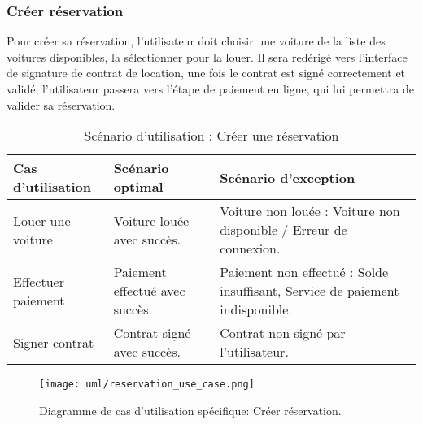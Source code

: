 \subsubsection{Créer réservation}
Pour créer sa réservation, l'utilisateur doit choisir une voiture de la liste des voitures disponibles, la sélectionner pour la louer. Il sera redérigé vers l'interface de signature de contrat de location, une fois le contrat est signé correctement et validé, l'utilisateur passera vers l'étape de paiement en ligne, qui lui permettra de valider sa réservation.
\begin{table}[H]
    \begin{center}
        \begin{tabularx}{\textwidth} {
                | >{\centering\arraybackslash}X
                | >{\centering\arraybackslash}X
                | >{\centering\arraybackslash}X |}
            \hline
            Cas d'utilisation  & Scénario optimal               & Scénario d'exception                                                         \\
            \hline
            Louer une voiture  & Voiture louée avec succès.     & Voiture non louée : Voiture non disponible / Erreur de connexion.            \\
            \hline
            Effectuer paiement & Paiement effectué avec succès. & Paiement non effectué : Solde insuffisant, Service de paiement indisponible. \\
            \hline
            Signer contrat     & Contrat signé avec succès.     & Contrat non signé par l'utilisateur.                                         \\
            \hline
        \end{tabularx}
        \captionsetup{justification=centering}
        \caption{Scénario d'utilisation : Créer une réservation}
        \label{tab:reservation_scenario}
    \end{center}
\end{table}
\begin{figure}[H]
    \centering
    \texttt{[image: uml/reservation\_use\_case.png]}
    \vspace{1cm}
    \captionsetup{justification=centering}
    \caption{Diagramme de cas d'utilisation spécifique: Créer réservation.}
    \label{fig:use_case_create_res}
\end{figure}
